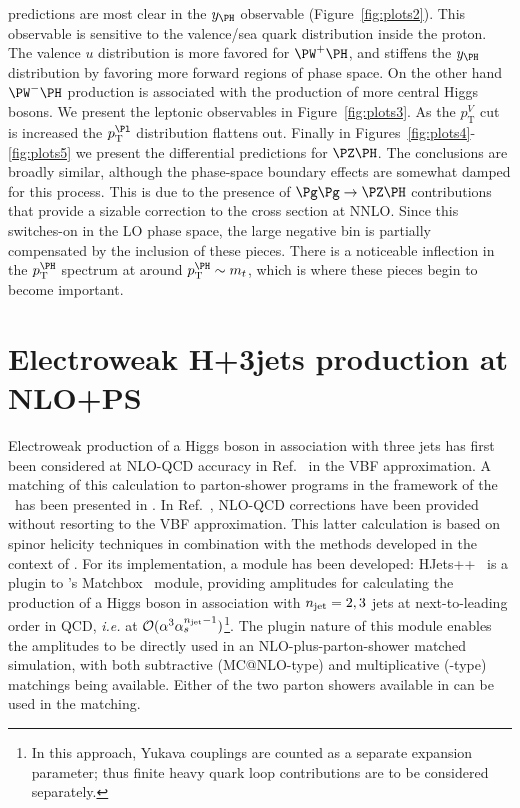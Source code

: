 predictions are most clear in the $y_{\PH}$ observable (Figure~\ref{fig:plots2}). This observable is sensitive to the
valence/sea quark distribution inside the proton. The valence $u$ distribution is more favored for $\PW^+\PH$, and
stiffens the $y_{\PH}$ distribution by favoring more forward regions of phase space. On the other hand $\PW^-\PH$
production is associated with the production of more central Higgs bosons.  We present the leptonic observables
in Figure~\ref{fig:plots3}. As the $p_{\mathrm{T}}^V$ cut is increased the $p_{\mathrm{T}}^{\Pl}$ distribution flattens out.  Finally
in Figures~\ref{fig:plots4}-\ref{fig:plots5} we present the differential predictions for $\PZ\PH$. The conclusions
are broadly similar, although the phase-space boundary effects are somewhat damped for this process.
This is due to the presence of $\Pg\Pg\rightarrow \PZ\PH$ contributions that provide a sizable correction to the cross
section at NNLO. Since this switches-on in the LO phase space, the large negative bin is partially compensated
by the inclusion of these pieces. There is a noticeable inflection in the $p_{\mathrm{T}}^{\PH}$ spectrum at around
$p_{\mathrm{T}}^{\PH} \sim m_t$, which is where these pieces begin to become important.

\clearpage

\section{Electroweak H+3jets production at NLO+PS}
%
Electroweak production of a Higgs boson in association with three jets has first been considered at NLO-QCD accuracy in Ref.~\cite{Figy:2007kv} in the VBF approximation. A matching of this calculation to parton-shower programs in the framework of the \POWHEGBOX\ has been presented in \cite{Jager:2014vna}.  In Ref.~\cite{Campanario:2013fsa}, NLO-QCD corrections have been provided without resorting to the VBF approximation. 
%
This latter calculation is based on spinor helicity techniques in
combination with the methods developed in the context of
\cite{Campanario:2011cs}. For its implementation, a module has been developed: 
\textsf{HJets++}~\cite{HJets:URL} is a plugin to 's
\textsf{Matchbox}~\cite{Bellm:2015jjp,Platzer:2011bc} module, providing
amplitudes for calculating the production of a Higgs boson in
association with $n_{{\rm jet}}=2,3$ jets at next-to-leading order in QCD,
{\it i.e.} at ${\cal O}(\alpha^3 \alpha_s^{n_{{\rm jet}}-1})$\footnote{In this approach, Yukava couplings are counted as a separate expansion parameter; thus finite heavy  quark loop contributions are to be considered separately.}. 
%
The plugin nature of this module enables the amplitudes to be
directly used in an NLO-plus-parton-shower matched simulation, with both
subtractive (MC@NLO-type) and multiplicative (\POWHEG{}-type) matchings being
available. Either of the two parton showers available in   can be used in
the matching. 

